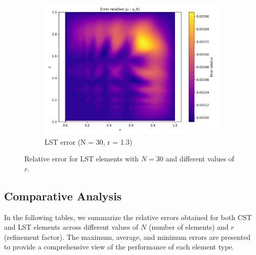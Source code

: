 \documentclass[12pt]{article}
\begin{document}
\begin{figure}[H]
    \hfill
    \begin{subfigure}[t]{0.32\textwidth}
        \centering
        \includegraphics[width=\textwidth]{Graficos/33/LST_relative_error_colormap.png}
        \caption{LST error (N = 30, r = 1.3)}
        \label{fig:lst_error_r1.3_n30}
    \end{subfigure}
    \caption{Relative error for LST elements with $N = 30$ and different values of $r$.}
    \label{fig:lst_error_comparison_n30}
\end{figure}


\subsection{Comparative Analysis}

In the following tables, we summarize the relative errors obtained for both CST and LST elements across different values of $N$ (number of elements) and $r$ (refinement factor). The maximum, average, and minimum errors are presented to provide a comprehensive view of the performance of each element type.
\end{document}
